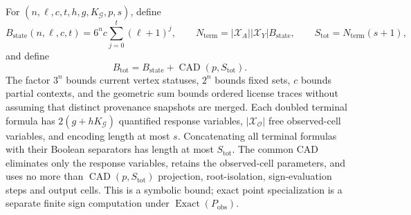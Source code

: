 For \((n,\ell,c,t,h,g,K_{\mathcal G},p,s)\), define \[B_{\mathrm{state}}(n,\ell,c,t)=6^n c\sum_{j=0}^{t}(\ell+1)^j,\qquad N_{\mathrm{term}}=|\mathcal X_A||\mathcal X_Y|B_{\mathrm{state}},\qquad S_{\mathrm{tot}}=N_{\mathrm{term}}(s+1),\] and define \[B_{\mathrm{tot}}=B_{\mathrm{state}}+\operatorname{CAD}(p,S_{\mathrm{tot}}).\] The factor \(3^n\) bounds current vertex statuses, \(2^n\) bounds fixed sets, \(c\) bounds partial contexts, and the geometric sum bounds ordered license traces without assuming that distinct provenance snapshots are merged. Each doubled terminal formula has \(2(g+hK_{\mathcal G})\) quantified response variables, \(|\mathcal X_{\mathcal O}|\) free observed-cell variables, and encoding length at most \(s\). Concatenating all terminal formulas with their Boolean separators has length at most \(S_{\mathrm{tot}}\). The common CAD eliminates only the response variables, retains the observed-cell parameters, and uses no more than \(\operatorname{CAD}(p,S_{\mathrm{tot}})\) projection, root-isolation, sign-evaluation steps and output cells. This is a symbolic bound; exact point specialization is a separate finite sign computation under \(\operatorname{Exact}(P_{\mathrm{obs}})\).